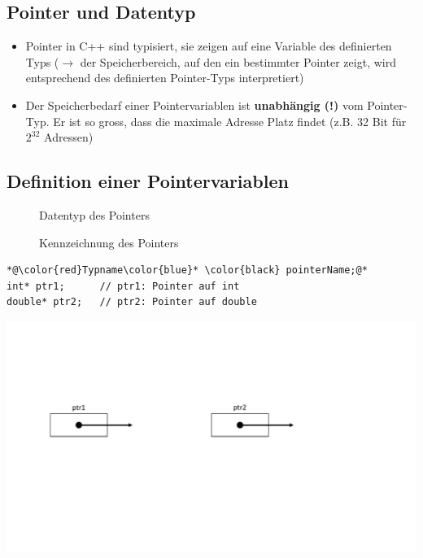\subsection{Pointer und Datentyp}
\begin{itemize}
	\item Pointer in C++ sind typisiert, sie zeigen auf eine Variable des definierten Typs ($\rightarrow$ der Speicherbereich, auf den ein bestimmter Pointer zeigt, wird entsprechend des definierten Pointer-Typs interpretiert) 
	\item Der Speicherbedarf einer Pointervariablen ist \textbf{unabhängig (!)} vom Pointer-Typ. Er ist so gross, dass die maximale Adresse Platz findet (z.B. 32 Bit für $2^{32}$ Adressen)
\end{itemize}

\subsection{Definition einer Pointervariablen}
\begin{description}
	\item[\color{red}{Typname}] Datentyp des Pointers
	\item[\color{blue}{*}] Kennzeichnung des Pointers
\end{description}
\vspace{-\baselineskip}
\begin{minipage}{0.5\linewidth}
\begin{lstlisting}
*@\color{red}Typname\color{blue}* \color{black} pointerName;@*
int* ptr1;		// ptr1: Pointer auf int
double* ptr2;	// ptr2: Pointer auf double
\end{lstlisting}
\end{minipage}
\hspace{0.01\linewidth}
\begin{minipage}{0.5\linewidth}
	\includegraphics[width=\linewidth]{images/pointer2.pdf}
\end{minipage}

